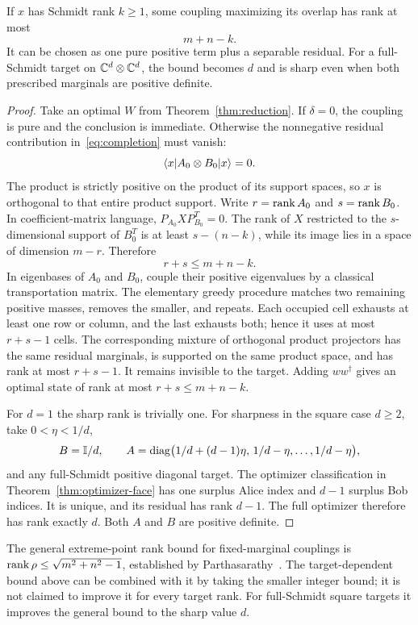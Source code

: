 \begin{theorem}\label{thm:rank-bound}
If $x$ has Schmidt rank $k\ge1$, some coupling maximizing its overlap has rank at most
\[
 \boxed{m+n-k.}
\]
It can be chosen as one pure positive term plus a separable residual. For a full-Schmidt target on $\mathbb C^d\otimes\mathbb C^d$, the bound becomes $d$ and is sharp even when both prescribed marginals are positive definite.
\end{theorem}
\begin{proof}
Take an optimal $W$ from Theorem~\ref{thm:reduction}. If $\delta=0$, the coupling is pure and the conclusion is immediate. Otherwise the nonnegative residual contribution in~\eqref{eq:completion} must vanish:
\[
 \langle x\rvert A_0\otimes B_0\lvert x\rangle=0.
\]
The product is strictly positive on the product of its support spaces, so $x$ is orthogonal to that entire product support. Write $r=\operatorname{rank} A_0$ and $s=\operatorname{rank} B_0$. In coefficient-matrix language, $P_{A_0}X P_{B_0}^T=0$. The rank of $X$ restricted to the $s$-dimensional support of $B_0^T$ is at least $s-(n-k)$, while its image lies in a space of dimension $m-r$. Therefore
\[
 r+s\le m+n-k.
\]
In eigenbases of $A_0$ and $B_0$, couple their positive eigenvalues by a classical transportation matrix. The elementary greedy procedure matches two remaining positive masses, removes the smaller, and repeats. Each occupied cell exhausts at least one row or column, and the last exhausts both; hence it uses at most $r+s-1$ cells. The corresponding mixture of orthogonal product projectors has the same residual marginals, is supported on the same product space, and has rank at most $r+s-1$. It remains invisible to the target. Adding $ww^\dagger$ gives an optimal state of rank at most $r+s\le m+n-k$.

For $d=1$ the sharp rank is trivially one. For sharpness in the square case $d\ge2$, take $0<\eta<1/d$,
\[
 B=\mathbb I/d,\qquad
 A=\operatorname{diag}\bigl(1/d+(d-1)\eta,\,1/d-\eta,\ldots,1/d-\eta\bigr),
\]
and any full-Schmidt positive diagonal target. The optimizer classification in Theorem~\ref{thm:optimizer-face} has one surplus Alice index and $d-1$ surplus Bob indices. It is unique, and its residual has rank $d-1$. The full optimizer therefore has rank exactly $d$. Both $A$ and $B$ are positive definite.
\end{proof}

The general extreme-point rank bound for fixed-marginal couplings is
$\operatorname{rank}\rho\le\sqrt{m^2+n^2-1}$, established by Parthasarathy~\cite{parthasarathy2003}. The target-dependent bound above can be combined with it by taking the smaller integer bound; it is not claimed to improve it for every target rank. For full-Schmidt square targets it improves the general bound to the sharp value $d$.

